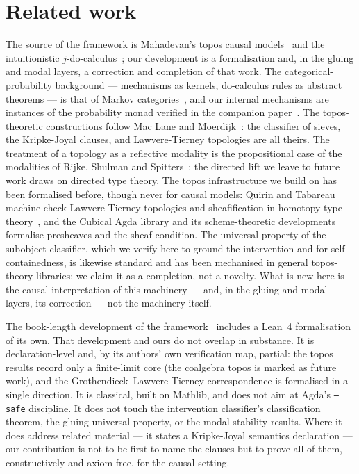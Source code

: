 \documentclass{lmcs}
\begin{document}
\section{Related work}\label{sec:related}

The source of the framework is Mahadevan's topos causal models~\cite{mahadevan-2025a,mahadevan-2025c} and the intuitionistic $j$-do-calculus~\cite{mahadevan-2025b}; our development is a formalisation and, in the gluing and modal layers, a correction and completion of that work.
The categorical-probability background --- mechanisms as kernels, do-calculus rules as abstract theorems --- is that of Markov categories~\cite{fritz-2020,cho-jacobs-2019}, and our internal mechanisms are instances of the probability monad verified in the companion paper~\cite{sargsyan-cubical-dsep}.
The topos-theoretic constructions follow Mac Lane and Moerdijk~\cite{maclane-moerdijk-1992}: the classifier of sieves, the Kripke-Joyal clauses, and Lawvere-Tierney topologies are all theirs.
The treatment of a topology as a reflective modality is the propositional case of the modalities of Rijke, Shulman and Spitters~\cite{rijke-shulman-spitters-2020}; the directed lift we leave to future work draws on directed type theory.
The topos infrastructure we build on has been formalised before, though never for causal models: Quirin and Tabareau machine-check Lawvere-Tierney topologies and sheafification in homotopy type theory~\cite{quirin-tabareau-2016}, and the Cubical Agda library and its scheme-theoretic developments~\cite{zeuner-mortberg-2024} formalise presheaves and the sheaf condition. The universal property of the subobject classifier, which we verify here to ground the intervention and for self-containedness, is likewise standard and has been mechanised in general topos-theory libraries; we claim it as a completion, not a novelty. What is new here is the causal interpretation of this machinery --- and, in the gluing and modal layers, its correction --- not the machinery itself.

The book-length development of the framework~\cite{mahadevan-catagi-2026} includes a Lean~4 formalisation of its own. That development and ours do not overlap in substance. It is declaration-level and, by its authors' own verification map, partial: the topos results record only a finite-limit core (the coalgebra topos is marked as future work), and the Grothendieck--Lawvere-Tierney correspondence is formalised in a single direction. It is classical, built on Mathlib, and does not aim at Agda's \texttt{--safe} discipline. It does not touch the intervention classifier's classification theorem, the gluing universal property, or the modal-stability results. Where it does address related material --- it states a Kripke-Joyal semantics declaration --- our contribution is not to be first to name the clauses but to prove all of them, constructively and axiom-free, for the causal setting.
\end{document}
